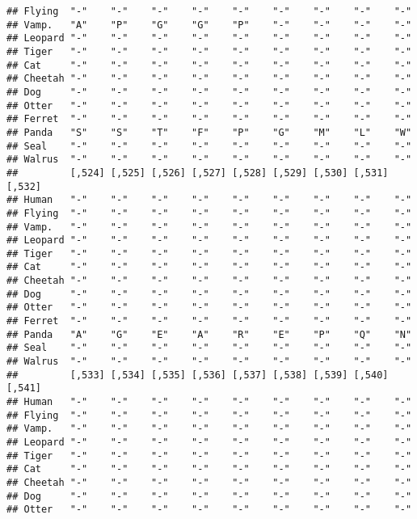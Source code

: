 \documentclass[]{article}
\begin{document}
\begin{verbatim}
## Flying  "-"    "-"    "-"    "-"    "-"    "-"    "-"    "-"    "-"   
## Vamp.   "A"    "P"    "G"    "G"    "P"    "-"    "-"    "-"    "-"   
## Leopard "-"    "-"    "-"    "-"    "-"    "-"    "-"    "-"    "-"   
## Tiger   "-"    "-"    "-"    "-"    "-"    "-"    "-"    "-"    "-"   
## Cat     "-"    "-"    "-"    "-"    "-"    "-"    "-"    "-"    "-"   
## Cheetah "-"    "-"    "-"    "-"    "-"    "-"    "-"    "-"    "-"   
## Dog     "-"    "-"    "-"    "-"    "-"    "-"    "-"    "-"    "-"   
## Otter   "-"    "-"    "-"    "-"    "-"    "-"    "-"    "-"    "-"   
## Ferret  "-"    "-"    "-"    "-"    "-"    "-"    "-"    "-"    "-"   
## Panda   "S"    "S"    "T"    "F"    "P"    "G"    "M"    "L"    "W"   
## Seal    "-"    "-"    "-"    "-"    "-"    "-"    "-"    "-"    "-"   
## Walrus  "-"    "-"    "-"    "-"    "-"    "-"    "-"    "-"    "-"   
##         [,524] [,525] [,526] [,527] [,528] [,529] [,530] [,531] [,532]
## Human   "-"    "-"    "-"    "-"    "-"    "-"    "-"    "-"    "-"   
## Flying  "-"    "-"    "-"    "-"    "-"    "-"    "-"    "-"    "-"   
## Vamp.   "-"    "-"    "-"    "-"    "-"    "-"    "-"    "-"    "-"   
## Leopard "-"    "-"    "-"    "-"    "-"    "-"    "-"    "-"    "-"   
## Tiger   "-"    "-"    "-"    "-"    "-"    "-"    "-"    "-"    "-"   
## Cat     "-"    "-"    "-"    "-"    "-"    "-"    "-"    "-"    "-"   
## Cheetah "-"    "-"    "-"    "-"    "-"    "-"    "-"    "-"    "-"   
## Dog     "-"    "-"    "-"    "-"    "-"    "-"    "-"    "-"    "-"   
## Otter   "-"    "-"    "-"    "-"    "-"    "-"    "-"    "-"    "-"   
## Ferret  "-"    "-"    "-"    "-"    "-"    "-"    "-"    "-"    "-"   
## Panda   "A"    "G"    "E"    "A"    "R"    "E"    "P"    "Q"    "N"   
## Seal    "-"    "-"    "-"    "-"    "-"    "-"    "-"    "-"    "-"   
## Walrus  "-"    "-"    "-"    "-"    "-"    "-"    "-"    "-"    "-"   
##         [,533] [,534] [,535] [,536] [,537] [,538] [,539] [,540] [,541]
## Human   "-"    "-"    "-"    "-"    "-"    "-"    "-"    "-"    "-"   
## Flying  "-"    "-"    "-"    "-"    "-"    "-"    "-"    "-"    "-"   
## Vamp.   "-"    "-"    "-"    "-"    "-"    "-"    "-"    "-"    "-"   
## Leopard "-"    "-"    "-"    "-"    "-"    "-"    "-"    "-"    "-"   
## Tiger   "-"    "-"    "-"    "-"    "-"    "-"    "-"    "-"    "-"   
## Cat     "-"    "-"    "-"    "-"    "-"    "-"    "-"    "-"    "-"   
## Cheetah "-"    "-"    "-"    "-"    "-"    "-"    "-"    "-"    "-"   
## Dog     "-"    "-"    "-"    "-"    "-"    "-"    "-"    "-"    "-"   
## Otter   "-"    "-"    "-"    "-"    "-"    "-"    "-"    "-"    "-"   

\end{verbatim}
\end{document}

